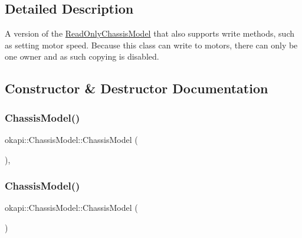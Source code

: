 \subsection{Detailed Description}
A version of the \mbox{\hyperlink{classokapi_1_1ReadOnlyChassisModel}{Read\+Only\+Chassis\+Model}} that also supports write methods, such as setting motor speed. Because this class can write to motors, there can only be one owner and as such copying is disabled. 

\subsection{Constructor \& Destructor Documentation}
\mbox{\label{classokapi_1_1ChassisModel_ae292afae5511e46eec17cf0f9bad1bb6}} 
\subsubsection{\texorpdfstring{ChassisModel()}{ChassisModel()}\hspace{0.1cm}{\footnotesize\ttfamily [1/2]}}
{\footnotesize\ttfamily okapi\+::\+Chassis\+Model\+::\+Chassis\+Model (\begin{DoxyParamCaption}{ }\end{DoxyParamCaption})\hspace{0.3cm}{\ttfamily [explicit]}, {\ttfamily [default]}}

\mbox{\label{classokapi_1_1ChassisModel_a8201eb131b58c99a2b93630758e8367d}} 
\subsubsection{\texorpdfstring{ChassisModel()}{ChassisModel()}\hspace{0.1cm}{\footnotesize\ttfamily [2/2]}}
{\footnotesize\ttfamily okapi\+::\+Chassis\+Model\+::\+Chassis\+Model (\begin{DoxyParamCaption}\item[{const \mbox{\hyperlink{classokapi_1_1ChassisModel}{Chassis\+Model}} \&}]{ }\end{DoxyParamCaption})\hspace{0.3cm}{\ttfamily [delete]}}



